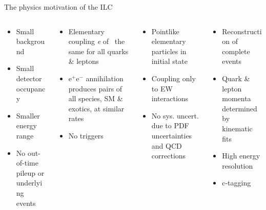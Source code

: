 \documentclass[xcolor={dvipsnames}]{beamer}
\begin{document}
\begin{frame}[fragile]{The physics motivation of the ILC}
{\begin{overprint}
\begin{columns}
\begin{column}{0.24\textwidth}
\begin{itemize}
\color{JungleGreen}
\item Small background
\item Small detector occupancy
\item Smaller energy range
\item No out-of-time pileup or underlying events
\end{itemize}
\end{column}
\begin{column}{0.26\textwidth}
\begin{itemize}
\color{WildStrawberry}
\item Elementary coupling \textit{e} of \textgamma \, the same for all quarks \& leptons
\item e$^+$e$^-$ annihilation produces pairs of all species, SM \& exotics, at similar rates
\item No triggers
\end{itemize}
\end{column}
\begin{column}{0.27\textwidth}
\begin{itemize}
\color{Periwinkle}
\item Pointlike elementary particles in initial state
\item Coupling only to EW interactions
\item No sys. uncert. due to PDF uncertainties and QCD corrections
\end{itemize}
\end{column}
\begin{column}{0.27\textwidth}
\begin{itemize}
\color{LimeGreen}
\item Reconstruction of complete events
\item Quark \& lepton momenta determined by kinematic fits
\item High energy resolution
\item c-tagging
\end{itemize}
\end{column}
\end{columns}
\end{overprint}
}%
\end{frame}
\end{document}
